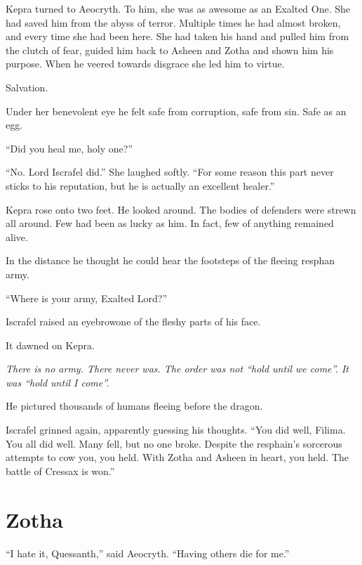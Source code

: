 \documentclass
  [a4paper,
   12pt,
   oneside
  ]%
  {article}
\begin{document}
Kepra turned to Aeocryth. 
To him, she was as awesome as an Exalted One. 
She had saved him from the abyss of terror. 
Multiple times he had almost broken, and every time she had been here.
She had taken his hand and pulled him from the clutch of fear, guided him back to Asheen and Zotha and shown him his purpose.
When he veered towards disgrace she led him to virtue.

Salvation.

Under her benevolent eye he felt safe from corruption, safe from sin. Safe as an egg.

``Did you heal me, holy one?''

``No. Lord Iscrafel did.'' She laughed softly. 
``For some reason this part never sticks to his reputation, but he is actually an excellent healer.''

Kepra rose onto two feet. He looked around. 
The bodies of defenders were strewn all around. 
Few had been as lucky as him. 
In fact, few of anything remained alive. 

In the distance he thought he could hear the footsteps of the fleeing resphan army. 

``Where is your army, Exalted Lord?''

Iscrafel raised an eyebrow\dash{}one of the fleshy parts of his face.

It dawned on Kepra. 

\emph{%
    There is no army. There never was. The order was not ``hold until we come''. It was ``hold until I come''.%
}

He pictured thousands of humans fleeing before the dragon.

Iscrafel grinned again, apparently guessing his thoughts. 
``You did well, Filima. You all did well. Many fell, but no one broke. Despite the resphain's sorcerous attempts to cow you, you held. With Zotha and Asheen in heart, you held. The battle of Cressax is won.''



\section{Zotha}
``I hate it, Quessanth,'' said Aeocryth. ``Having others die for me.''
\end{document}
